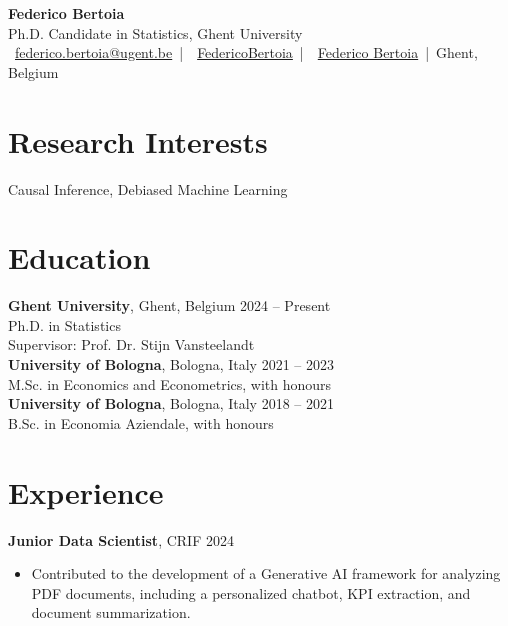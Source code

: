 \documentclass[11pt]{article}
\begin{document}
\begin{center}
{\huge \textbf{Federico Bertoia}}\\[3pt]
Ph.D. Candidate in Statistics, Ghent University\\[3pt]
~\href{mailto:federico.bertoia@ugent.be}{federico.bertoia@ugent.be} \,|\, 
~\href{https://github.com/FedericoBertoia}{FedericoBertoia} \,|\, 
~\href{https://www.linkedin.com/in/federicobertoia/}{Federico Bertoia} \,|\, 
Ghent, Belgium
\end{center}

\vspace{1em}

\section*{Research Interests}
Causal Inference, Debiased Machine Learning

\section*{Education}
\textbf{Ghent University}, Ghent, Belgium \hfill 2024 – Present\\
Ph.D. in Statistics \\
Supervisor: Prof. Dr. Stijn Vansteelandt 
\\[3pt]

\textbf{University of Bologna}, Bologna, Italy \hfill 2021 – 2023\\
M.Sc. in Economics and Econometrics, with honours\\[3pt]

\textbf{University of Bologna}, Bologna, Italy \hfill 2018 – 2021\\
B.Sc. in Economia Aziendale, with honours


\section*{Experience}

\textbf{Junior Data Scientist}, CRIF  \hfill 2024\\
\begin{itemize}
    \item Contributed to the development of a Generative AI framework for analyzing PDF documents, including a personalized chatbot, KPI extraction, and document summarization.
\end{itemize}
\end{document}

